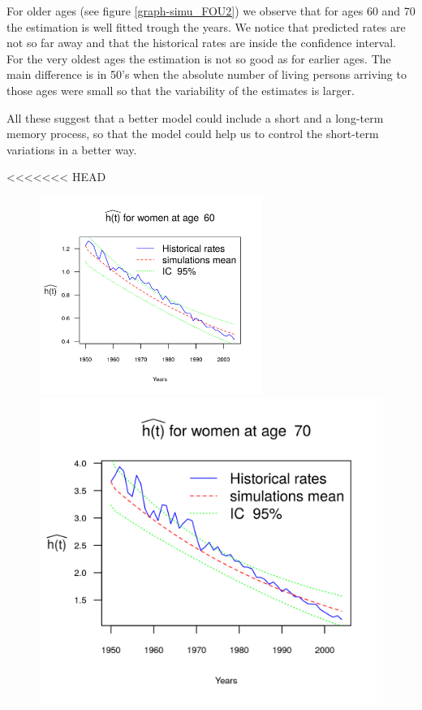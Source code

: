 \documentclass[smallextended]{svjour3}
\begin{document}
For older ages (see figure \ref{graph-simu_FOU2}) we observe that for ages 60
and 70 the estimation is well fitted trough the years. We notice that
predicted rates are not so far away and that the historical rates are inside
the confidence interval. For the very oldest ages the estimation is not so good
as for earlier ages. The main difference is in 50's when the absolute number of
living persons arriving to those ages were small so that the variability of the
estimates is larger. 

All these suggest that a better model could include a short and a long-term
memory process, so that the model could help us to control the short-term
variations in a better way.

<<<<<<< HEAD
\begin{figure}[H]
    \includegraphics[width = 2.85in]{PlotWomen60.png}
    \includegraphics{PlotWomen70.png}

\end{figure}
\end{document}
